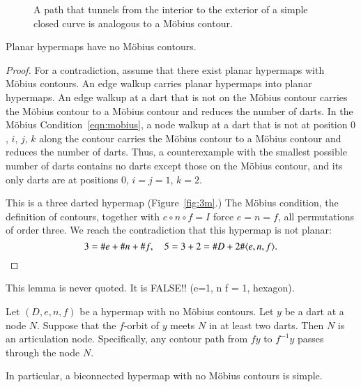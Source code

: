 \begin{figure}[htb]
  \centering
  \caption{A path that tunnels from the interior to the exterior
   of a simple closed curve
   is analogous to a M\"obius contour.}
  \label{fig:violate-jct}
\end{figure}






\begin{lemma}
Planar hypermaps have no M\"obius contours.
\end{lemma}

\begin{proof} For a contradiction, assume that there exist planar
hypermaps with M\"obius contours.  An edge walkup carries
planar hypermaps into planar hypermaps. An edge walkup
at a dart that is not on the M\"obius contour carries the
M\"obius contour to a M\"obius contour 
and reduces the number of darts.  
In the M\"obius Condition~\ref{eqn:mobius},
a node walkup at a dart that is not at position $0$, $i$, $j$, $k$
along the contour carries the M\"obius contour to a M\"obius contour
and reduces the number of darts. Thus, a counterexample with
the smallest possible number of darts contains no
darts except those on the M\"obius contour, and its only darts
are at positions $0$, $i=j=1$, $k=2$.

This is a three darted hypermap (Figure~\ref{fig:3m}.)  
The M\"obius condition, the
definition of contours, together with $e\circ n\circ f=I$ force
$e=n=f$, all permutations of order three. We reach the contradiction
that this hypermap is not planar:
    $$3 = \# e + \# n + \# f,\quad 5 = 3+2 = \# D + 2 \#\langle e,n,f\rangle.$$
\end{proof}

\begin{note} %
This lemma is never quoted.  It is FALSE!!  (e=1, n f = 1, hexagon).
\end{note}

\begin{lemma}  
Let $(D,e,n,f)$ be a hypermap with no M\"obius contours.
Let $y$ be a dart at a node $N$.
Suppose that the $f$-orbit of $y$ meets $N$ in
at least two darts.  Then $N$ is an articulation node.  Specifically,  any contour path from $f y$
to $f^{-1} y$ passes through the node $N$.  
\end{lemma}

In particular, a biconnected hypermap with no M\"obius contours is simple.

